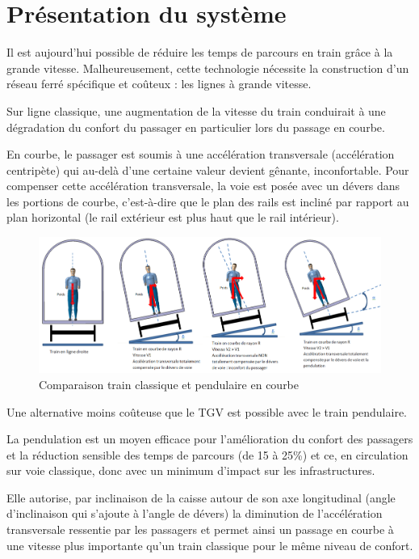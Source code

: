 

\section{Présentation du système}

Il est aujourd'hui possible de réduire les temps de parcours en train grâce à la grande vitesse. Malheureusement, cette technologie nécessite la construction d'un réseau ferré spécifique et coûteux : les lignes à grande vitesse.

Sur ligne classique, une augmentation de la vitesse du train conduirait à une dégradation du confort du passager en particulier lors du passage en courbe.

En courbe, le passager est soumis à une accélération transversale (accélération centripète) qui au-delà d'une certaine valeur devient gênante, inconfortable. Pour compenser cette accélération transversale, la voie est posée avec un dévers dans les portions de courbe, c'est-à-dire que le plan des rails est incliné par rapport au plan horizontal (le rail extérieur est plus haut que le rail intérieur).

\begin{figure}[!h]
 \centering\includegraphics[width=\linewidth]{img/fig1}
 \caption{Comparaison train classique et pendulaire en courbe}
 \label{img01}
\end{figure}

Une alternative moins coûteuse que le TGV est possible avec le train pendulaire.

La pendulation est un moyen efficace pour l'amélioration du confort des passagers et la réduction sensible des temps de parcours (de 15 à 25\%) et ce, en circulation sur voie classique, donc avec un minimum d'impact sur les infrastructures.

Elle autorise, par inclinaison de la caisse autour de son axe longitudinal (angle d'inclinaison qui s'ajoute à l'angle de dévers) la diminution de l'accélération transversale ressentie par les passagers et permet ainsi un passage en courbe à une vitesse plus importante qu'un train classique pour le même niveau de confort.

